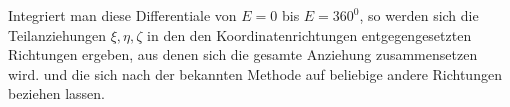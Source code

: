 Integriert man diese Differentiale von $E=0$ bis $E=360^{0}$, so werden sich die Teilanziehungen $\xi,\eta,\zeta$ in den den Koordinatenrichtungen entgegengesetzten Richtungen ergeben, aus denen sich die gesamte Anziehung zusammensetzen wird. und die sich nach der bekannten Methode auf beliebige andere Richtungen beziehen lassen.


\clearpage
\endgroup
